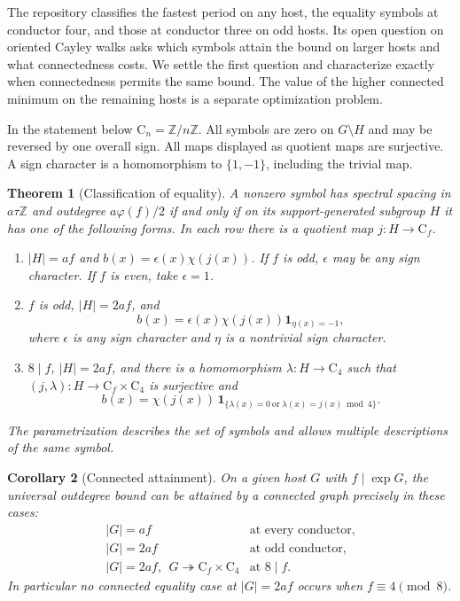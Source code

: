 \documentclass[11pt,letterpaper]{article}
\newtheorem{theorem}{Theorem}[section]
\newtheorem{corollary}[theorem]{Corollary}
\newcommand{\Z}{\mathbb Z}\newcommand{\F}{\mathbb F}\newcommand{\E}{\mathbb E}
\newcommand{\Cyc}{\mathrm C}
\newcommand{\one}{\mathbf 1}
\newcommand{\rr}{\textup{(R)}}\newcommand{\ooe}{\textup{(O)}}\newcommand{\ee}{\textup{(E)}}
\begin{document}
The repository classifies the fastest period on any host, the equality symbols at conductor four, and those at conductor three on odd hosts. Its open question on oriented Cayley walks asks which symbols attain the bound on larger hosts and what connectedness costs. We settle the first question and characterize exactly when connectedness permits the same bound. The value of the higher connected minimum on the remaining hosts is a separate optimization problem.

In the statement below $\Cyc_n=\Z/n\Z$. All symbols are zero on $G\setminus H$ and may be reversed by one overall sign. All maps displayed as quotient maps are surjective. A sign character is a homomorphism to $\{1,-1\}$, including the trivial map.

\begin{theorem}[Classification of equality]\label{th:main}
A nonzero symbol has spectral spacing in $a\tau\Z$ and outdegree $a\varphi(f)/2$ if and only if on its support-generated subgroup $H$ it has one of the following forms. In each row there is a quotient map $j:H\to\Cyc_f$.
\begin{enumerate}[leftmargin=1.15cm]
\item[\rr] $|H|=af$ and $b(x)=\epsilon(x)\chi(j(x))$. If $f$ is odd, $\epsilon$ may be any sign character. If $f$ is even, take $\epsilon=1$.
\item[\ooe] $f$ is odd, $|H|=2af$, and
\[
 b(x)=\epsilon(x)\chi(j(x))\one_{\eta(x)=-1},
\]
where $\epsilon$ is any sign character and $\eta$ is a nontrivial sign character.
\item[\ee] $8\mid f$, $|H|=2af$, and there is a homomorphism $\lambda:H\to\Cyc_4$ such that $(j,\lambda):H\to\Cyc_f\times\Cyc_4$ is surjective and
\[
 b(x)=\chi(j(x))\,
 \one_{\{\lambda(x)=0\ \text{or}\ \lambda(x)=j(x)\bmod4\}} .
\]
\end{enumerate}
The parametrization describes the set of symbols and allows multiple descriptions of the same symbol.
\end{theorem}

\begin{corollary}[Connected attainment]\label{cor:connected}
On a given host $G$ with $f\mid\exp G$, the universal outdegree bound can be attained by a connected graph precisely in these cases:
\[
\begin{array}{ll}
 |G|=af & \text{at every conductor},\\
 |G|=2af & \text{at odd conductor},\\
 |G|=2af,\ \ G\twoheadrightarrow\Cyc_f\times\Cyc_4 & \text{at }8\mid f .
\end{array}
\]
In particular no connected equality case at $|G|=2af$ occurs when $f\equiv4\pmod8$.
\end{corollary}
\end{document}
